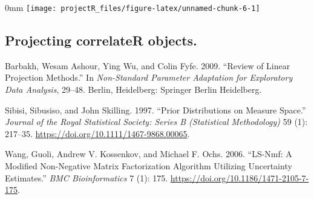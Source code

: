 \documentclass[]{article}
\newcommand{\hlnum}[1]{\textcolor[rgb]{0.816,0.125,0.439}{#1}}%
\newcommand{\hlstr}[1]{\textcolor[rgb]{0.251,0.627,0.251}{#1}}%
\newcommand{\hlcom}[1]{\textcolor[rgb]{0.502,0.502,0.502}{\textit{#1}}}%
\newcommand{\hlopt}[1]{\textcolor[rgb]{0,0,0}{#1}}%
\newcommand{\hlstd}[1]{\textcolor[rgb]{0.251,0.251,0.251}{#1}}%
\newcommand{\hlkwc}[1]{\textcolor[rgb]{0.251,0.251,0.251}{#1}}%
\newcommand{\hlkwd}[1]{\textcolor[rgb]{0.878,0.439,0.125}{#1}}%
\newenvironment{Shaded}{\begin{myshaded}}{\end{myshaded}}
\newcommand{\KeywordTok}[1]{\hlkwd{#1}}
\newcommand{\DataTypeTok}[1]{\hlkwc{#1}}
\newcommand{\DecValTok}[1]{\hlnum{#1}}
\newcommand{\StringTok}[1]{\hlstr{#1}}
\newcommand{\CommentTok}[1]{\hlcom{#1}}
\newcommand{\OtherTok}[1]{{#1}}
\newcommand{\OperatorTok}[1]{\hlopt{#1}}
\newcommand{\NormalTok}[1]{\hlstd{#1}}
\begin{document}
\begin{adjustwidth}{\fltoffset}{0mm}
\texttt{[image: projectR\_files/figure-latex/unnamed-chunk-6-1]} \end{adjustwidth}

\hypertarget{projecting-correlater-objects.}{%
\subsection{Projecting correlateR objects.}\label{projecting-correlater-objects.}}

\begin{Shaded}
\end{Shaded}

\hypertarget{refs}{}
\leavevmode\hypertarget{ref-Barbakh:2009bw}{}%
Barbakh, Wesam Ashour, Ying Wu, and Colin Fyfe. 2009. ``Review of Linear Projection Methods.'' In \emph{Non-Standard Parameter Adaptation for Exploratory Data Analysis}, 29--48. Berlin, Heidelberg: Springer Berlin Heidelberg.

\leavevmode\hypertarget{ref-Sibisi1997}{}%
Sibisi, Sibusiso, and John Skilling. 1997. ``Prior Distributions on Measure Space.'' \emph{Journal of the Royal Statistical Society: Series B (Statistical Methodology)} 59 (1): 217--35. \url{https://doi.org/10.1111/1467-9868.00065}.

\leavevmode\hypertarget{ref-Ochs2006}{}%
Wang, Guoli, Andrew V. Kossenkov, and Michael F. Ochs. 2006. ``LS-Nmf: A Modified Non-Negative Matrix Factorization Algorithm Utilizing Uncertainty Estimates.'' \emph{BMC Bioinformatics} 7 (1): 175. \url{https://doi.org/10.1186/1471-2105-7-175}.
\end{document}
